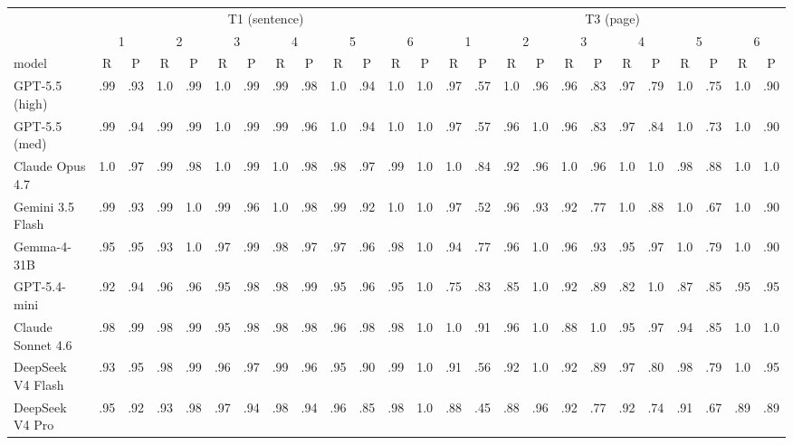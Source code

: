 \documentclass[11pt]{article}
\begin{document}
\begin{table}[t]
\centering\footnotesize\setlength{\tabcolsep}{2.1pt}
\begin{tabular}{@{}lcccccccccccc@{\hspace{8pt}}cccccccccccc@{}}
\toprule
 & \multicolumn{12}{c}{T1 (sentence)} & \multicolumn{12}{c}{T3 (page)} \\
\cmidrule(lr){2-13}\cmidrule(l){14-25}
 & \multicolumn{2}{c}{1} & \multicolumn{2}{c}{2} & \multicolumn{2}{c}{3} & \multicolumn{2}{c}{4} & \multicolumn{2}{c}{5} & \multicolumn{2}{c}{6} & \multicolumn{2}{c}{1} & \multicolumn{2}{c}{2} & \multicolumn{2}{c}{3} & \multicolumn{2}{c}{4} & \multicolumn{2}{c}{5} & \multicolumn{2}{c}{6} \\
model & R & P & R & P & R & P & R & P & R & P & R & P & R & P & R & P & R & P & R & P & R & P & R & P \\
\midrule
GPT-5.5 (high) & .99 & .93 & 1.0 & .99 & 1.0 & .99 & .99 & .98 & 1.0 & .94 & 1.0 & 1.0 & .97 & .57 & 1.0 & .96 & .96 & .83 & .97 & .79 & 1.0 & .75 & 1.0 & .90 \\
GPT-5.5 (med) & .99 & .94 & .99 & .99 & 1.0 & .99 & .99 & .96 & 1.0 & .94 & 1.0 & 1.0 & .97 & .57 & .96 & 1.0 & .96 & .83 & .97 & .84 & 1.0 & .73 & 1.0 & .90 \\
Claude Opus 4.7 & 1.0 & .97 & .99 & .98 & 1.0 & .99 & 1.0 & .98 & .98 & .97 & .99 & 1.0 & 1.0 & .84 & .92 & .96 & 1.0 & .96 & 1.0 & 1.0 & .98 & .88 & 1.0 & 1.0 \\
Gemini 3.5 Flash & .99 & .93 & .99 & 1.0 & .99 & .96 & 1.0 & .98 & .99 & .92 & 1.0 & 1.0 & .97 & .52 & .96 & .93 & .92 & .77 & 1.0 & .88 & 1.0 & .67 & 1.0 & .90 \\
Gemma-4-31B & .95 & .95 & .93 & 1.0 & .97 & .99 & .98 & .97 & .97 & .96 & .98 & 1.0 & .94 & .77 & .96 & 1.0 & .96 & .93 & .95 & .97 & 1.0 & .79 & 1.0 & .90 \\
GPT-5.4-mini & .92 & .94 & .96 & .96 & .95 & .98 & .98 & .99 & .95 & .96 & .95 & 1.0 & .75 & .83 & .85 & 1.0 & .92 & .89 & .82 & 1.0 & .87 & .85 & .95 & .95 \\
Claude Sonnet 4.6 & .98 & .99 & .98 & .99 & .95 & .98 & .98 & .98 & .96 & .98 & .98 & 1.0 & 1.0 & .91 & .96 & 1.0 & .88 & 1.0 & .95 & .97 & .94 & .85 & 1.0 & 1.0 \\
DeepSeek V4 Flash & .93 & .95 & .98 & .99 & .96 & .97 & .99 & .96 & .95 & .90 & .99 & 1.0 & .91 & .56 & .92 & 1.0 & .92 & .89 & .97 & .80 & .98 & .79 & 1.0 & .95 \\
DeepSeek V4 Pro & .95 & .92 & .93 & .98 & .97 & .94 & .98 & .94 & .96 & .85 & .98 & 1.0 & .88 & .45 & .88 & .96 & .92 & .77 & .92 & .74 & .91 & .67 & .89 & .89 \\

\end{tabular}
\end{table}
\end{document}
